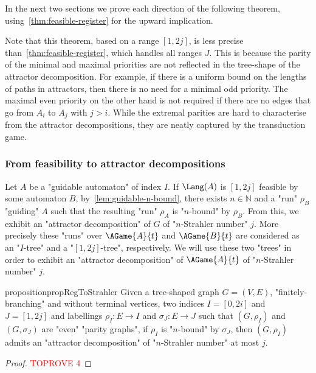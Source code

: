 \documentclass[a4paper,UKenglish,cleveref, autoref, thm-restate]{lipics-v2021}
\newcommand{\NN}{\mathbb{N}}
\begin{document}
In the next two sections we prove each direction of the following theorem, using~\cref{thm:feasible-register} for the upward implication.

\thmparityattractors*

\begin{remark}Note that this theorem, based on a range $[1,2j]$, is less precise than~\cref{thm:feasible-register}, which handles all ranges $J$. This is because the parity of the minimal and maximal priorities are not reflected in the tree-shape of the attractor decomposition. For example, if there is a uniform bound on the lengths of paths in attractors, then there is no need for a minimal odd priority. The maximal even priority on the other hand is not required if there are no edges that go from $A_i$ to $A_j$ with $j>i$.  While the extremal parities are hard to characterise from the attractor decompositions, they are neatly captured by the transduction game.
	\end{remark}

\subsubsection{From feasibility to attractor decompositions}

Let $A$ be a "guidable automaton" of index $I$. If $\Lang(A)$ is $[1,2j]$ feasible by some automaton $B$, by~\cref{lem:guidable-n-bound}, there exists $n\in \NN$ and a "run" $\rho_B$ "guiding" $A$ such that the resulting "run" $\rho_A$ is "$n$-bound" by $\rho_B$. From this, we exhibit an "attractor decomposition" of $G$ of "$n$-Strahler number" $j$. More precisely these "runs" over $\AGame{A}{t}$ and $\AGame{B}{t}$ are considered as an "$I$-tree" and a "$[1,2j]$-tree", respectively. We will use these two "trees" in order to exhibit an "attractor decomposition" of $\AGame{A}{t}$ of "$n$-Strahler number" $j$.

\begin{restatable}{proposition}{propRegToStrahler}\label{lem:Reg-to-Strahler}
Given a tree-shaped graph $G=(V,E)$, "finitely-branching" and without terminal vertices,
two indices $I=[0,2i]$ and  $J=[1,2j]$ and
labellings $\rho_I:E\rightarrow I$ and $\sigma_J: E\rightarrow J$
such that $(G,\rho_I)$ and $(G,\sigma_J)$ are "even" "parity graphs",
if $\rho_I$ is "$n$-bound" by $\sigma_J$, 
then $(G,\rho_I)$ admits an "attractor decomposition" of "$n$-Strahler number" at most $j$.
\end{restatable}

\begin{proof}\textcolor{red}{TOPROVE 4}\end{proof}
\end{document}
